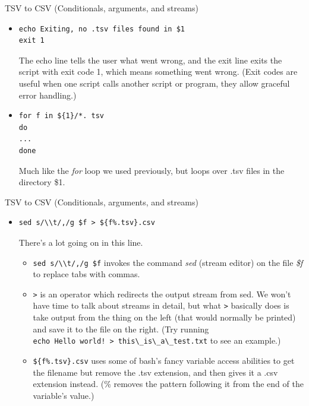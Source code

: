 \documentclass{beamer}
\begin{document}
\begin{frame}[fragile]{TSV to CSV (Conditionals, arguments, and streams)}
\begin{itemize}
\item<1->
\begin{lstlisting}
echo Exiting, no .tsv files found in $1
exit 1
\end{lstlisting} 
The echo line tells the user what went wrong, and the exit line exits the script with exit code 1, which means something went wrong. (Exit codes are useful when one script calls another script or program, they allow graceful error handling.)
\item<2->
\begin{lstlisting}
for f in ${1}/*. tsv
do
...
done
\end{lstlisting}
Much like the \emph{for} loop we used previously, but loops over .tsv files in the directory \$1.
\end{itemize}
\end{frame}

\begin{frame}[fragile]{TSV to CSV (Conditionals, arguments, and streams)}
\begin{itemize}
\item<1->
\begin{lstlisting}
sed s/\\t/,/g $f > ${f%.tsv}.csv
\end{lstlisting} 
There's a lot going on in this line.
\begin{itemize}
    \item<2-> \lstinline|sed s/\\t/,/g $f| invokes the command \emph{sed} (stream editor) on the file \emph{\$f} to replace tabs with commas.
    \item<3-> \lstinline|>| is an operator which redirects the output stream from sed. We won't have time to talk about streams in detail, but what \lstinline|>| basically does is take output from the thing on the left (that would normally be printed) and save it to the file on the right. (Try running \\\lstinline|echo Hello world! > this\_is\_a\_test.txt| to see an example.)
    \item<4-> \lstinline|${f%.tsv}.csv| uses some of bash's fancy variable access abilities to get the filename but remove the .tsv extension, and then gives it a .csv extension instead. (\% removes the pattern following it from the end of the variable's value.)
\end{itemize} 
\end{itemize}
\end{frame}
\end{document}

